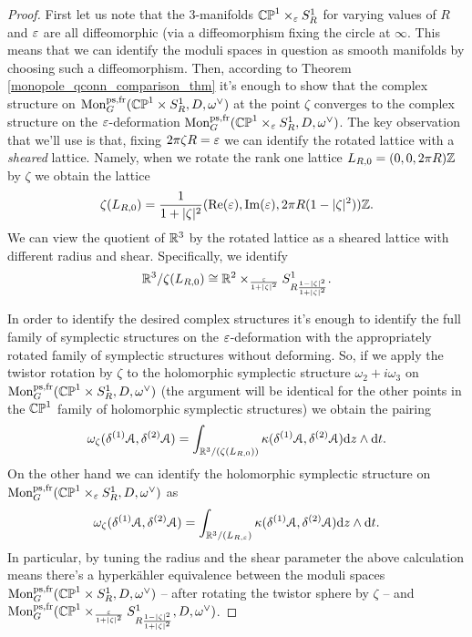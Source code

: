 \documentclass[10pt, oneside]{article}
\DeclareMathOperator{\mon}{Mon}
\renewcommand{\d}{\mathrm{d}}
\newcommand{\fr}{\mathrm{fr}}
\begin{document}
\begin{proof}
First let us note that the 3-manifolds $\mathbb{CP}^1 \times_\varepsilon S^1_R$ for varying values of $R$ and $\varepsilon$ are all diffeomorphic (via a diffeomorphism fixing the circle at $\infty$.  This means that we can identify the moduli spaces in question as smooth manifolds by choosing such a diffeomorphism.  Then, according to Theorem \ref{monopole_qconn_comparison_thm} it's enough to show that the complex structure on $\mon_G^{\text{ps,fr}}(\bb{CP}^1 \times S^1_R,D,\omega^\vee)$ at the point $\zeta$ converges to the complex structure on the $\varepsilon$-deformation $\mon_G^{\mr{ps},\fr}(\bb{CP}^1 \times_\eps S^1_R,D,\omega^\vee)$.  The key observation that we'll use is that, fixing $2 \pi \zeta R = \varepsilon$ we can identify the rotated lattice with a \emph{sheared} lattice.  Namely, when we rotate the rank one lattice $L_{R,0} = (0,0,2\pi R)\mathbb{Z}$ by $\zeta$ we obtain the lattice
\[\zeta(L_{R,0}) = \frac {1}{1+|\zeta|^2} (\mathrm{Re}(\varepsilon), \mathrm{Im}(\varepsilon), 2\pi R (1-|\zeta|^2) )\mathbb{Z}.\]
We can view the quotient of $\mathbb{R}^3$ by the rotated lattice as a sheared lattice with different radius and shear.  Specifically, we identify
\[\mathbb{R}^3 / \zeta(L_{R,0}) \cong \mathbb{R}^2 \times_{\frac{\varepsilon}{1+|\zeta|^2}} S^1_{R \frac {1-|\zeta|^2}{1+|\zeta|^2}}.\]

In order to identify the desired complex structures it's enough to identify the full family of symplectic structures on the $\varepsilon$-deformation with the appropriately rotated family of symplectic structures without deforming.  So, if we apply the twistor rotation by $\zeta$ to the holomorphic symplectic structure $\omega_2 + i\omega_3$ on $\mon_G^{\text{ps,fr}}(\bb{CP}^1 \times S^1_R,D,\omega^\vee)$ (the argument will be identical for the other points in the $\mathbb{CP}^1$ family of holomorphic symplectic structures) we obtain the pairing
\[\omega_\zeta(\delta^{(1)}\mc A, \delta^{(2)}\mc A) = \int_{\RR^3/(\zeta(L_{R,0}))} \kappa(\delta^{(1)} \mc A, \delta^{(2)} \mc A) \d z  \wedge \d t.\]
On the other hand we can identify the holomorphic symplectic structure on $\mon_G^{\mr{ps},\fr}(\bb{CP}^1 \times_\eps S^1_R,D,\omega^\vee)$ as
\[\omega_\zeta(\delta^{(1)}\mc A, \delta^{(2)}\mc A) = \int_{\RR^3/(L_{R,\eps})} \kappa(\delta^{(1)} \mc A, \delta^{(2)} \mc A) \d z  \wedge \d t.\]
In particular, by tuning the radius and the shear parameter the above calculation means there's a hyperk\"ahler equivalence between the moduli spaces $\mon_G^{\text{ps,fr}}(\bb{CP}^1 \times S^1_R,D,\omega^\vee)$ -- after rotating the twistor sphere by $\zeta$ -- and $\mon_G^{\mr{ps},\fr}(\bb{CP}^1 \times_{\frac{\eps}{1+|\zeta|^2}} S^1_{R \frac {1-|\zeta|^2}{1+|\zeta|^2}},D,\omega^\vee)$.  


\end{proof}
\end{document}
